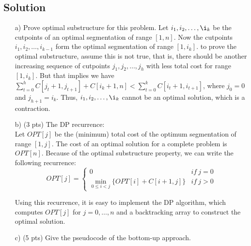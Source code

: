 \documentclass{article}
\begin{document}
\subsection*{Solution}
\color{blue}
\begin{itemize}
\item[a)] Prove optimal substructure for this problem.
Let $i_1, i_2, \ldots, \i_k$ be the cutpoints of an optimal segmentation of range $[1,n]$. Now the cutpoints $i_1, i_2, \ldots, i_{k-1}$ form the optimal segmentation of range $[1,i_k]$. to prove the optimal substructure, assume this is not true, that is, there should be another increasing sequence of cutpoints $j_1,j_2, \ldots, j_h$ with less total cost for range $[1,i_k]$. But that implies we have 
$\sum_{t=0}^h C[j_t + 1, j_{t+1}] + C[i_k + 1, n]  <  \sum_{t=0}^k C[i_t + 1, i_{t+1}]$, where $j_0 = 0$ and $j_{h+1} = i_k$. Thus, $i_1, i_2, \ldots, \i_k$ cannot be an optimal solution, which is a contraction. 
\item[b)] (3 pts) The DP recurrence:\\
Let $OPT[j]$ be the (minimum) total cost of the optimum segmentation of range $[1,j]$. The cost of an optimal solution for a complete problem is $OPT[n]$. Because of the optimal substructure property, we can write the following recurrence:
$$
 OPT[j] =
    \begin{cases}
      0 & if\ j=0 \\
      \min\limits_{0 \leq i < j} \{ OPT[i] + C[i+1,j] \}  & if\ j>0
    \end{cases} 
$$

Using this recurrence, it is easy to implement the DP algorithm, which computes $OPT[j]$ for $j=0,\ldots,n$ and a backtracking array to construct the optimal solution.

\item[c)] (5 pts) Give the pseudocode of the bottom-up approach. 

\begin{center}
	\begin{minipage}{0.8\linewidth} %
\end{minipage}
\end{center}
\end{itemize}
\end{document}
